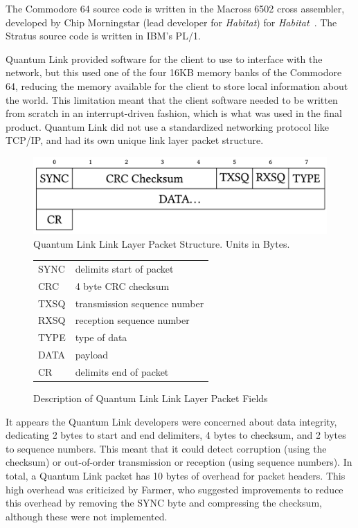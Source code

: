 The Commodore 64 source code is written in the Macross 6502 cross assembler, developed by Chip Morningstar (lead developer for \textit{Habitat}) for \textit{Habitat}~\cite{macrosssrc}. The Stratus source code is written in IBM's PL/1.

Quantum Link provided software for the client to use to interface with the network, but this used one of the four 16KB memory banks of the Commodore 64, reducing the memory available for the client to store local information about the world. This limitation meant that the client software needed to be written from scratch in an interrupt-driven fashion, which is what was used in the final product. Quantum Link did not use a standardized networking protocol like TCP/IP, and had its own unique link layer packet structure.

\begin{figure}[h]
  \includegraphics[scale=0.18]{figures/QLink-Diagram}
  \caption{Quantum Link Link Layer Packet Structure. Units in Bytes.}
\end{figure}

\begin{figure}[h]
  \begin{tabular}{l l}
    SYNC& delimits start of packet\\
    CRC& 4 byte CRC checksum\\
    TXSQ& transmission sequence number\\
    RXSQ& reception sequence number\\
    TYPE& type of data\\
    DATA& payload\\
    CR& delimits end of packet
  \end{tabular}
  \caption{Description of Quantum Link Link Layer Packet Fields}
\end{figure}

It appears the Quantum Link developers were concerned about data integrity, dedicating 2 bytes to start and end delimiters, 4 bytes to checksum, and 2 bytes to sequence numbers. This meant that it could detect corruption (using the checksum) or out-of-order transmission or reception (using sequence numbers). In total, a Quantum Link packet has 10 bytes of overhead for packet headers. This high overhead was criticized by Farmer, who suggested improvements to reduce this overhead by removing the SYNC byte and compressing the checksum, although these were not implemented.

